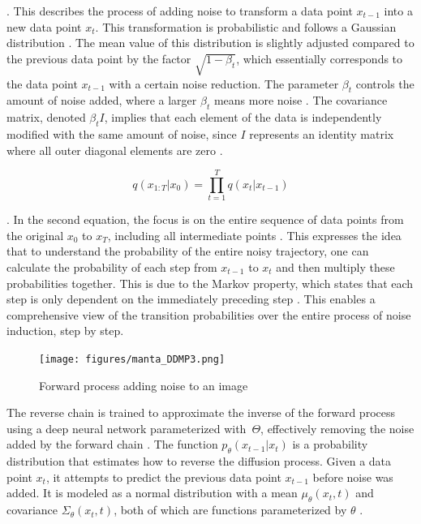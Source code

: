 \citep{martinez2023understanding}. This describes the process of adding noise to transform a data point \( x_{t-1} \) into a new data point \( x_t \). This transformation is probabilistic and follows a Gaussian distribution \citep{sohlDDPM, hoDDPMs}. The mean value of this distribution is slightly adjusted compared to the previous data point by the factor \( \sqrt{1 - \beta_t} \), which essentially corresponds to the data point \( x_{t-1} \) with a certain noise reduction. The parameter \( \beta_t \) controls the amount of noise added, where a larger \( \beta_t \) means more noise \citep{kingma2023variationalDM}. The covariance matrix, denoted \( \beta_t I \), implies that each element of the data is independently modified with the same amount of noise, since \(I\) represents an identity matrix where all outer diagonal elements are zero \citep{croitoru2023diffusion}.

\[q(x_{1:T} | x_0) = \prod_{t=1}^T q(x_t | x_{t-1}) \] 

\citep{martinez2023understanding}. In the second equation, the focus is on the entire sequence of data points from the original \( x_0 \) to \( x_T \), including all intermediate points \citep{martinez2023understanding}. This expresses the idea that to understand the probability of the entire noisy trajectory, one can calculate the probability of each step from \( x_{t-1} \) to \( x_t \) and then multiply these probabilities together. This is due to the Markov property, which states that each step is only dependent on the immediately preceding step \citep{martinez2023understanding}. This enables a comprehensive view of the transition probabilities over the entire process of noise induction, step by step.

\begin{figure}[ht]
\centering
  \texttt{[image: figures/manta\_DDMP3.png]}
  \caption{Forward process adding noise to an image}\label{fig:figureForwardProcess}
\end{figure}

The reverse chain is trained to approximate the inverse of the forward process using a deep neural network parameterized with~\(\Theta\), effectively removing the noise added by the forward chain \citep{sohlDDPM, yangdiffusionSummary}. The function \( p_\theta(x_{t-1} | x_t) \) is a probability distribution that estimates how to reverse the diffusion process. Given a data point \( x_t \), it attempts to predict the previous data point \( x_{t-1} \) before noise was added. It is modeled as a normal distribution with a mean \( \mu_\theta(x_t, t) \) and covariance \( \Sigma_\theta(x_t, t) \), both of which are functions parameterized by \( \theta \) \citep{yangdiffusionSummary}.

